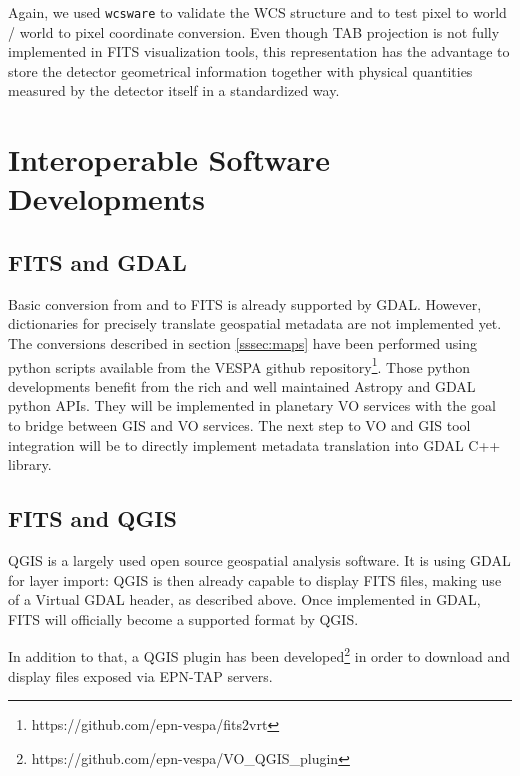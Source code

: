 Again, we used \texttt{wcsware} to validate the WCS structure and to test pixel to
world / world to pixel coordinate conversion.
Even though TAB projection is not fully implemented in FITS visualization tools,
this representation has the advantage to store the detector geometrical information
together with physical quantities measured by the detector itself in a standardized way.

\section{Interoperable Software Developments}
\label{sec:softdev}

\subsection{FITS and GDAL}
Basic conversion from and to FITS is already supported by GDAL.
However, dictionaries for precisely translate geospatial metadata are not implemented
yet.
The conversions described in section \ref{sssec:maps} have been performed using python
scripts available from the VESPA github repository\footnote{https://github.com/epn-vespa/fits2vrt}.
Those python developments benefit from the rich and well maintained Astropy and GDAL
python APIs.
They will be implemented in planetary VO services with the goal to bridge between GIS 
and VO services.
The next step to VO and GIS tool integration will be to directly implement metadata 
translation into GDAL C++ library. 

\subsection{FITS and QGIS}
QGIS is a largely used open source geospatial analysis software.
It is using GDAL for layer import: QGIS is then already capable to display FITS files,
making use of a Virtual GDAL header, as described above.
Once implemented in GDAL, FITS will officially become a supported format by QGIS.

In addition to that, a QGIS plugin has been developed\footnote{https://github.com/epn-vespa/VO\_QGIS\_plugin}
\citep{Minin} in order to download and display files exposed via EPN-TAP servers.

